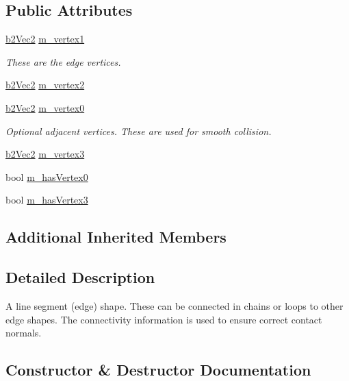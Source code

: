 \subsection*{Public Attributes}
\begin{DoxyCompactItemize}
\item 
\mbox{\hyperlink{structb2_vec2}{b2\+Vec2}} \mbox{\hyperlink{classb2_edge_shape_a916cf02a752ff1a70db35b2edaf19bb4}{m\+\_\+vertex1}}
\begin{DoxyCompactList}\small\item\em These are the edge vertices. \end{DoxyCompactList}\item 
\mbox{\hyperlink{structb2_vec2}{b2\+Vec2}} \mbox{\hyperlink{classb2_edge_shape_aa218bfe2bf135e4e94028b29aaa32fce}{m\+\_\+vertex2}}
\item 
\mbox{\hyperlink{structb2_vec2}{b2\+Vec2}} \mbox{\hyperlink{classb2_edge_shape_a907c9829484cc1ba7527ab368e9fdf93}{m\+\_\+vertex0}}
\begin{DoxyCompactList}\small\item\em Optional adjacent vertices. These are used for smooth collision. \end{DoxyCompactList}\item 
\mbox{\hyperlink{structb2_vec2}{b2\+Vec2}} \mbox{\hyperlink{classb2_edge_shape_a7991fd8b38806a7785748cd991c18452}{m\+\_\+vertex3}}
\item 
bool \mbox{\hyperlink{classb2_edge_shape_a1d0f39259f0963146b343d6b048f3f8a}{m\+\_\+has\+Vertex0}}
\item 
bool \mbox{\hyperlink{classb2_edge_shape_afeb0dfac66fe677ccd765d48610fa56f}{m\+\_\+has\+Vertex3}}
\end{DoxyCompactItemize}
\subsection*{Additional Inherited Members}


\subsection{Detailed Description}
A line segment (edge) shape. These can be connected in chains or loops to other edge shapes. The connectivity information is used to ensure correct contact normals. 

\subsection{Constructor \& Destructor Documentation}
\mbox{\label{classb2_edge_shape_ab1a6b6e22c725215c3bbbe093a7d44c0}} 
